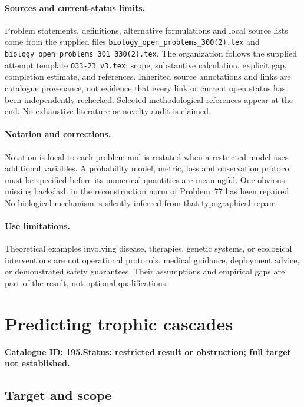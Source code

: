 \documentclass[11pt]{article}
\begin{document}
\paragraph{Sources and current-status limits.}
Problem statements, definitions, alternative formulations and local source lists
come from the supplied files
\texttt{biology\_open\_problems\_300(2).tex} and
\texttt{biology\_open\_problems\_301\_330(2).tex}.
The organization follows the supplied attempt template
\texttt{O33-23\_v3.tex}: scope, substantive calculation, explicit gap,
completion estimate, and references. Inherited source annotations and links are
catalogue provenance, not evidence that every link or current open status has
been independently rechecked. Selected methodological references appear at the
end. No exhaustive literature or novelty audit is claimed.

\paragraph{Notation and corrections.}
Notation is local to each problem and is restated when a restricted model uses
additional variables. A probability model, metric, loss and observation protocol
must be specified before its numerical quantities are meaningful. One obvious
missing backslash in the reconstruction norm of Problem~77 has been repaired.
No biological mechanism is silently inferred from that typographical repair.

\paragraph{Use limitations.}
Theoretical examples involving disease, therapies, genetic systems, or ecological
interventions are not operational protocols, medical guidance, deployment advice,
or demonstrated safety guarantees. Their assumptions and empirical gaps are part
of the result, not optional qualifications.

\setcounter{section}{194}
\section{Predicting trophic cascades}
\label{prob:195}
\noindent\textbf{Catalogue ID: 195.}\quad \textbf{Status: restricted result or obstruction; full target not established.}
\subsection{Target and scope}
\end{document}
